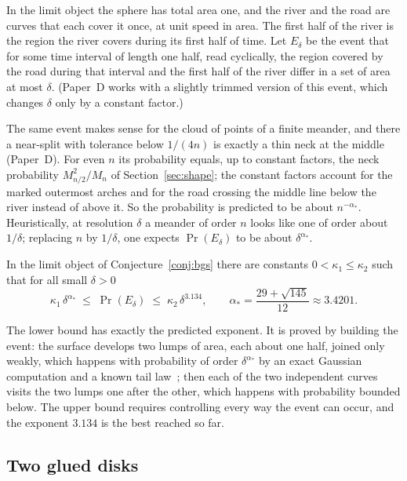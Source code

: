 In the limit object the sphere has total area one, and the river and the road are curves that
each cover it once, at unit speed in area. The first half of the river is the region the river
covers during its first half of time. Let $E_\delta$ be the event that for some time interval of
length one half, read cyclically, the region covered by the road during that interval and the
first half of the river differ in a set of area at most $\delta$. (Paper~D works with a slightly
trimmed version of this event, which changes $\delta$ only by a constant factor.)

The same event makes sense for the cloud of points of a finite meander, and there a near-split
with tolerance below $1/(4n)$ is exactly a thin neck at the middle (Paper~D). For even $n$ its
probability equals, up to constant factors, the neck probability $M_{n/2}^2/M_n$ of
Section~\ref{sec:shape}; the constant factors account for the marked outermost arches and for
the road crossing the middle line below the river instead of above it. So the probability is predicted to be about
$n^{-\alpha_*}$. Heuristically, at resolution $\delta$ a meander of order $n$ looks like one of
order about $1/\delta$; replacing $n$ by $1/\delta$, one expects $\Pr(E_\delta)$ to be about
$\delta^{\alpha_*}$.

\begin{theorem}\label{thm:nearsplit}
In the limit object of Conjecture~\ref{conj:bgs} there are constants $0<\kappa_1\le\kappa_2$ such that for
all small $\delta>0$
\[ \kappa_1\,\delta^{\alpha_*} \;\le\; \Pr(E_\delta) \;\le\; \kappa_2\,\delta^{3.134}, \qquad \alpha_*=\frac{29+\sqrt{145}}{12}\approx3.4201 .\]
\end{theorem}

The lower bound has exactly the predicted exponent. It is proved by building the event: the
surface develops two lumps of area, each about one half, joined only weakly, which happens with
probability of order $\delta^{\alpha_*}$ by an exact Gaussian computation and a known tail
law~\cite{Wong}; then each of the two independent curves visits the two lumps one after the other,
which happens with probability bounded below. The upper bound requires controlling every way the
event can occur, and the exponent $3.134$ is the best reached so far.

\subsection{Two glued disks}\label{sec:twodisk}

